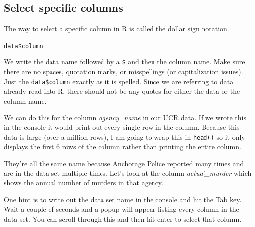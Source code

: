 \documentclass[
]{krantz}
\makeatletter
\newenvironment{Shaded}{\begin{snugshade}}{\end{snugshade}}
\newcommand{\CommentTok}[1]{\textcolor[rgb]{0.37,0.37,0.37}{\textit{#1}}}
\newcommand{\FunctionTok}[1]{\textcolor[rgb]{0,0,0}{#1}}
\newcommand{\NormalTok}[1]{#1}
\newcommand{\SpecialCharTok}[1]{\textcolor[rgb]{0,0,0}{#1}}
\newenvironment{kframe}{%
\medskip{}
\setlength{\fboxsep}{.8em}
 \def\at@end@of@kframe{}%
 \ifinner\ifhmode%
  \def\at@end@of@kframe{\end{minipage}}%
  \begin{minipage}{\columnwidth}%
 \fi\fi%
 \def\FrameCommand##1{\hskip\@totalleftmargin \hskip-\fboxsep
 \colorbox{shadecolor}{##1}\hskip-\fboxsep
     \hskip-\linewidth \hskip-\@totalleftmargin \hskip\columnwidth}%
 \MakeFramed {\advance\hsize-\width
   \@totalleftmargin\z@ \linewidth\hsize
   \@setminipage}}%
 {\par\unskip\endMakeFramed%
 \at@end@of@kframe}
\renewenvironment{Shaded}{\begin{kframe}}{\end{kframe}}
\makeatother
\begin{document}
\hypertarget{select-specific-columns}{%
\subsection{Select specific columns}\label{select-specific-columns}}

The way to select a specific column in R is called the dollar sign notation.

\texttt{data\$column}

We write the data name followed by a \texttt{\$} and then the column name. Make sure there are no spaces, quotation marks, or misspellings (or capitalization issues). Just the \texttt{data\$column} exactly as it is spelled. Since we are referring to data already read into R, there should not be any quotes for either the data or the column name.

We can do this for the column \emph{agency\_name} in our UCR data. If we wrote this in the console it would print out every single row in the column. Because this data is large (over a million rows), I am going to wrap this in \texttt{head()} so it only displays the first 6 rows of the column rather than printing the entire column.

\begin{Shaded}
\end{Shaded}

They're all the same name because Anchorage Police reported many times and are in the data set multiple times. Let's look at the column \emph{actual\_murder} which shows the annual number of murders in that agency.

\begin{Shaded}
\end{Shaded}

One hint is to write out the data set name in the console and hit the Tab key. Wait a couple of seconds and a popup will appear listing every column in the data set. You can scroll through this and then hit enter to select that column.
\end{document}
